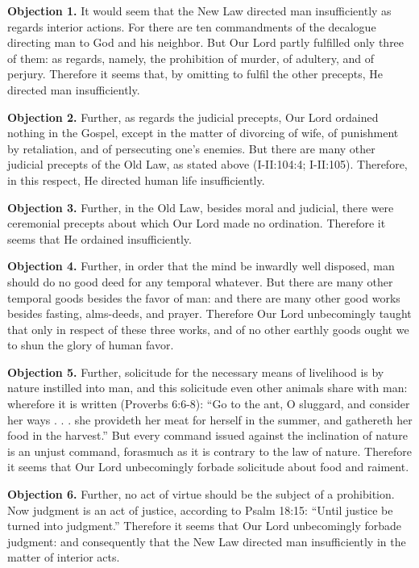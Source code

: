 
\textbf{Objection 1.} It would seem that the New Law directed man insufficiently as regards interior actions. For there are ten commandments of the decalogue directing man to God and his neighbor. But Our Lord partly fulfilled only three of them: as regards, namely, the prohibition of murder, of adultery, and of perjury. Therefore it seems that, by omitting to fulfil the other precepts, He directed man insufficiently.

\textbf{Objection 2.} Further, as regards the judicial precepts, Our Lord ordained nothing in the Gospel, except in the matter of divorcing of wife, of punishment by retaliation, and of persecuting one's enemies. But there are many other judicial precepts of the Old Law, as stated above (I-II:104:4; I-II:105). Therefore, in this respect, He directed human life insufficiently.

\textbf{Objection 3.} Further, in the Old Law, besides moral and judicial, there were ceremonial precepts about which Our Lord made no ordination. Therefore it seems that He ordained insufficiently.

\textbf{Objection 4.} Further, in order that the mind be inwardly well disposed, man should do no good deed for any temporal whatever. But there are many other temporal goods besides the favor of man: and there are many other good works besides fasting, alms-deeds, and prayer. Therefore Our Lord unbecomingly taught that only in respect of these three works, and of no other earthly goods ought we to shun the glory of human favor.

\textbf{Objection 5.} Further, solicitude for the necessary means of livelihood is by nature instilled into man, and this solicitude even other animals share with man: wherefore it is written (Proverbs 6:6-8): ``Go to the ant, O sluggard, and consider her ways . . . she provideth her meat for herself in the summer, and gathereth her food in the harvest.'' But every command issued against the inclination of nature is an unjust command, forasmuch as it is contrary to the law of nature. Therefore it seems that Our Lord unbecomingly forbade solicitude about food and raiment.

\textbf{Objection 6.} Further, no act of virtue should be the subject of a prohibition. Now judgment is an act of justice, according to Psalm 18:15: ``Until justice be turned into judgment.'' Therefore it seems that Our Lord unbecomingly forbade judgment: and consequently that the New Law directed man insufficiently in the matter of interior acts.

